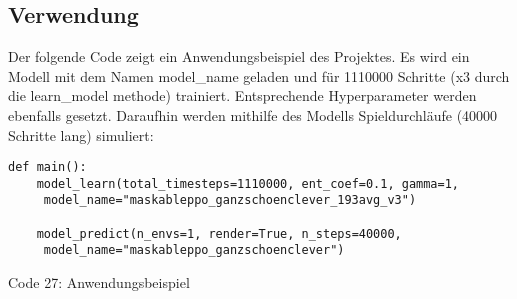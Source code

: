 \subsection{Verwendung}
\begin{minipage}{\linewidth}
Der folgende Code zeigt ein Anwendungsbeispiel des Projektes. Es  wird ein Modell mit dem Namen model\_name geladen und für 1110000 Schritte (x3 durch die learn\_model methode) trainiert. Entsprechende Hyperparameter werden ebenfalls gesetzt. Daraufhin werden mithilfe des Modells Spieldurchläufe (40000 Schritte lang) simuliert:
\vspace{0.5cm}
\begin{lstlisting}
def main():
	model_learn(total_timesteps=1110000, ent_coef=0.1, gamma=1, 
	 model_name="maskableppo_ganzschoenclever_193avg_v3")
	
	model_predict(n_envs=1, render=True, n_steps=40000,
	 model_name="maskableppo_ganzschoenclever")
\end{lstlisting}
Code 27: Anwendungsbeispiel\\
\end{minipage}